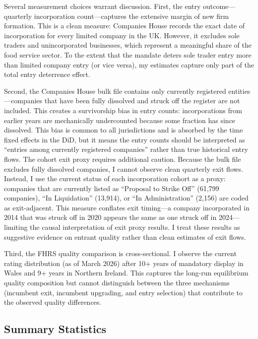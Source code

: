 \documentclass[12pt]{article}
\begin{document}
Several measurement choices warrant discussion. First, the entry outcome---quarterly incorporation count---captures the extensive margin of new firm formation. This is a clean measure: Companies House records the exact date of incorporation for every limited company in the UK. However, it excludes sole traders and unincorporated businesses, which represent a meaningful share of the food service sector. To the extent that the mandate deters sole trader entry more than limited company entry (or vice versa), my estimates capture only part of the total entry deterrence effect.

Second, the Companies House bulk file contains only currently registered entities---companies that have been fully dissolved and struck off the register are not included. This creates a survivorship bias in entry counts: incorporations from earlier years are mechanically undercounted because some fraction has since dissolved. This bias is common to all jurisdictions and is absorbed by the time fixed effects in the DiD, but it means the entry counts should be interpreted as ``entries among currently registered companies'' rather than true historical entry flows. The cohort exit proxy requires additional caution. Because the bulk file excludes fully dissolved companies, I cannot observe clean quarterly exit flows. Instead, I use the current status of each incorporation cohort as a proxy: companies that are currently listed as ``Proposal to Strike Off'' (61,799 companies), ``In Liquidation'' (13,914), or ``In Administration'' (2,156) are coded as exit-adjacent. This measure conflates exit timing---a company incorporated in 2014 that was struck off in 2020 appears the same as one struck off in 2024---limiting the causal interpretation of exit proxy results. I treat these results as suggestive evidence on entrant quality rather than clean estimates of exit flows.

Third, the FHRS quality comparison is cross-sectional. I observe the current rating distribution (as of March 2026) after 10+ years of mandatory display in Wales and 9+ years in Northern Ireland. This captures the long-run equilibrium quality composition but cannot distinguish between the three mechanisms (incumbent exit, incumbent upgrading, and entry selection) that contribute to the observed quality differences.

\subsection{Summary Statistics}
\end{document}
